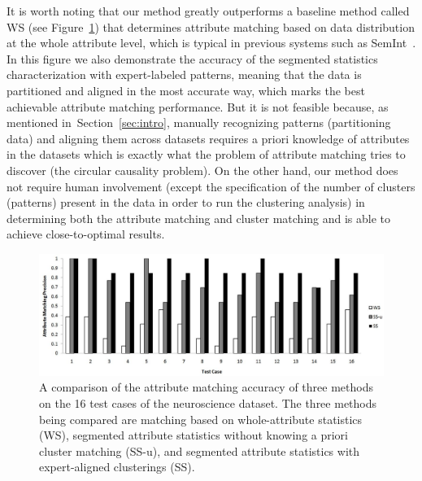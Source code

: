 It is worth noting that our method greatly outperforms a baseline method called WS (see Figure~\ref{fig:perf_comp}) that determines attribute matching based on data distribution at the whole attribute level, which is typical in previous systems such as SemInt~\cite{Li00semint:a}. In this figure we also demonstrate the accuracy of the segmented statistics characterization with expert-labeled patterns, meaning that the data is partitioned and aligned in the most accurate way, which marks the best achievable attribute matching performance. But it is not feasible because, as mentioned in~Section~\ref{sec:intro}, manually recognizing patterns (partitioning data) and aligning them across datasets requires a priori knowledge of attributes in the datasets which is exactly what the problem of attribute matching tries to discover (the circular causality problem). On the other hand, our method does not require human involvement (except the specification of the number of clusters (patterns) present in the data in order to run the clustering analysis) in determining both the attribute matching and cluster matching and is able to achieve close-to-optimal results.

\begin{figure}[tb]
\begin{center}
\includegraphics[width=1.\textwidth]{fig/perf_comp.eps}
\end{center}
\caption{\label{fig:perf_comp} A comparison of the attribute matching accuracy of three methods on the 16 test cases of the neuroscience dataset. The three methods being compared are matching based on whole-attribute statistics (WS), segmented attribute statistics without knowing a priori cluster matching (SS-u), and segmented attribute statistics with expert-aligned clusterings (SS).}
\end{figure}


